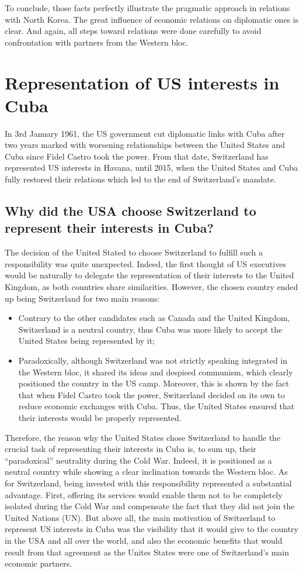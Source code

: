 \documentclass[a4paper]{article}
\begin{document}
To conclude, those facts perfectly illustrate the pragmatic approach in relations with North Korea. The great influence of economic relations on diplomatic ones is clear. And again, all steps toward relations were done carefully to avoid confrontation with partners from the Western bloc.
\clearpage
\section{Representation of US interests in Cuba}
In 3rd January 1961, the US government cut diplomatic links with Cuba after two years marked with worsening relationships between the United States and Cuba since Fidel Castro took the power. 
From that date, Switzerland has represented US interests in Havana, until 2015, when the United States and Cuba fully restored their relations which led to the end of Switzerland’s mandate. 
\subsection{Why did the USA choose Switzerland to represent their interests in Cuba?}
The decision of the United Stated to choose Switzerland to fulfill such a responsibility was quite unexpected. Indeed, the first thought of US executives would be naturally to delegate the representation of their interests to the United Kingdom, as both countries share similarities. 
However, the chosen country ended up being Switzerland for two main reasons:
\begin{itemize}
\item Contrary to the other candidates such as Canada and the United Kingdom, Switzerland is a neutral country, thus Cuba was more likely to accept the United States being represented by it;
\item Paradoxically, although Switzerland was not strictly speaking integrated in the Western bloc, it shared its ideas and despised communism, which clearly positioned the country in the US camp. Moreover, this is shown by the fact that when Fidel Castro took the power, Switzerland decided on its own to reduce economic exchanges with Cuba. Thus, the United States ensured that their interests would be properly represented. 
\end{itemize}
Therefore, the reason why the United States chose Switzerland to handle the crucial task of representing their interests in Cuba is, to sum up, their “paradoxical” neutrality during the Cold War. Indeed, it is positioned as a neutral country while showing a clear inclination towards the Western bloc. 
As for Switzerland, being invested with this responsibility represented a substantial advantage. First, offering its services would enable them not to be completely isolated during the Cold War and compensate the fact that they did not join the United Nations (UN). But above all, the main motivation of Switzerland to represent US interests in Cuba was the visibility that it would give to the country in the USA and all over the world, and also the economic benefits that would result from that agreement as the Unites States were one of Switzerland’s main economic partners. 
\end{document}

